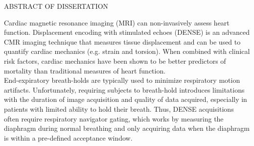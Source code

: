 
\thispagestyle{empty} %

\newcommand*{\SignatureAndDate}[2]{%
	\par\hfill\noindent\makebox[2.5in]{#1}
	\vspace{-0.15in}
	\par\hfill\noindent\makebox[2.5in]{\hrulefill}
	\par\hfill\makebox[2.5in][c]{}
	\vspace{0.05in}
	\par\hfill\noindent\makebox[2.5in]{#2}
	\vspace{-0.15in}
	\par\hfill\noindent\makebox[2.5in]{\hrulefill}
	\vspace{-0.05in}
	\par\hfill\noindent\makebox[2.5in][c]{Date}
}%

\begin{center}
	ABSTRACT OF DISSERTATION\\
	\vspace{0.5in}
	\makeatletter
	\@title
	\makeatother
\end{center}

Cardiac magnetic resonance imaging (MRI) can non-invasively assess heart function. Displacement encoding with stimulated echoes (DENSE) is an advanced CMR imaging technique that measures tissue displacement and can be used to quantify cardiac mechanics (e.g. strain and torsion). When combined with clinical risk factors, cardiac mechanics have been shown to be better predictors of mortality than traditional measures of heart function.\\

End-expiratory breath-holds are typically used to minimize respiratory motion artifacts. Unfortunately, requiring subjects to breath-hold introduces limitations with the duration of image acquisition and quality of data acquired, especially in patients with limited ability to hold their breath. Thus, DENSE acquisitions often require respiratory navigator gating, which works by measuring the diaphragm during normal breathing and only acquiring data when the diaphragm is within a pre-defined acceptance window.\\

